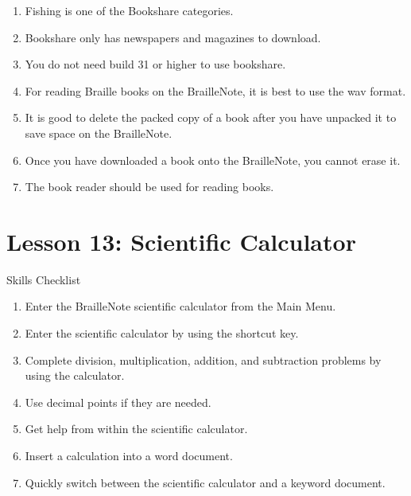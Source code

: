 \documentclass[10pt,letterpaper,twoside]{report}
\begin{document}
{{{{\begin{enumerate}
	\item Fishing is one of the Bookshare categories.
	      
	\item Bookshare only has newspapers and magazines to download.
	      
	\item You do not need build 31 or higher to use bookshare.
	      
	\item For reading Braille books on the BrailleNote, it is best to use the wav format.
	      
	\item It is good to delete the packed copy of a book after you have unpacked it to save space on the BrailleNote.
	      
	\item Once you have downloaded a book onto the BrailleNote, you cannot erase it.
	      
	\item The book reader should be used for reading books.
\end{enumerate}

\section*{Lesson 13: Scientific Calculator}


Skills Checklist



\begin{enumerate}
	\item Enter the BrailleNote scientific calculator from the Main Menu.
	      
	\item Enter the scientific calculator by using the shortcut key.
	      
	\item Complete division, multiplication, addition, and subtraction problems by using the calculator.
	      
	\item Use decimal points if they are needed.
	      
	\item Get help from within the scientific calculator.
	      
	\item Insert a calculation into a word document.
	      
	\item Quickly switch between the scientific calculator and a keyword document.
	      

\end{enumerate}}}}}
\end{document}
